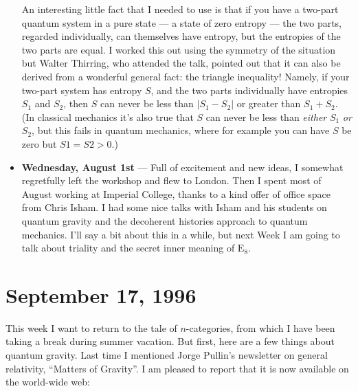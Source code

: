 \documentclass{article}
\def\tightlist{}
\renewcommand{\texttt}[1]{%
  \begingroup
  \ttfamily
  \begingroup\lccode`~=`/\lowercase{\endgroup\def~}{/\discretionary{}{}{}}%
  \begingroup\lccode`~=`[\lowercase{\endgroup\def~}{[\discretionary{}{}{}}%
  \begingroup\lccode`~=`.\lowercase{\endgroup\def~}{.\discretionary{}{}{}}%
  \catcode`/=\active\catcode`[=\active\catcode`.=\active
  \scantokens{#1\noexpand}%
  \endgroup
}
\begin{document}
\begin{itemize}
  An interesting little fact that I needed to use is that if you have a
  two-part quantum system in a pure state --- a state of zero entropy
  --- the two parts, regarded individually, can themselves have entropy,
  but the entropies of the two parts are equal. I worked this out using
  the symmetry of the situation but Walter Thirring, who attended the
  talk, pointed out that it can also be derived from a wonderful general
  fact: the triangle inequality! Namely, if your two-part system has
  entropy \(S\), and the two parts individually have entropies \(S_1\)
  and \(S_2\), then \(S\) can never be less than \(|S_1 - S_2|\) or
  greater than \(S_1 + S_2\). (In classical mechanics it's also true
  that \(S\) can never be less than \emph{either} \(S_1\) \emph{or}
  \(S_2\), but this fails in quantum mechanics, where for example you
  can have \(S\) be zero but \(S1 = S2 > 0\).)
\item
  \textbf{Wednesday, August 1st} --- Full of excitement and new ideas, I
  somewhat regretfully left the workshop and flew to London. Then I
  spent most of August working at Imperial College, thanks to a kind
  offer of office space from Chris Isham. I had some nice talks with
  Isham and his students on quantum gravity and the decoherent histories
  approach to quantum mechanics. I'll say a bit about this in a while,
  but next Week I am going to talk about triality and the secret inner
  meaning of \(\mathrm{E}_8\).
\end{itemize}



\hypertarget{week89}{%
\section{September 17, 1996}\label{week89}}

This week I want to return to the tale of \(n\)-categories, from which I
have been taking a break during summer vacation. But first, here are a
few things about quantum gravity. Last time I mentioned Jorge Pullin's
newsletter on general relativity, ``Matters of Gravity''. I am pleased
to report that it is now available on the world-wide web:

\end{document}
